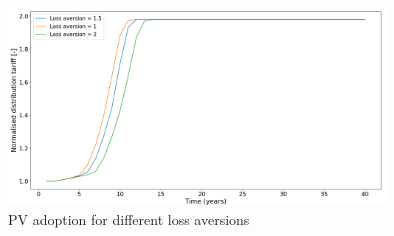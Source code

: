 \noindent
\newline
\begin{figure}[h!]
    \centering
    \includegraphics[width=10cm]{AppendixA/DistNBloss.PNG}
    \caption{PV adoption for different loss aversions}
    \label{fig:H}
\end{figure}
\newline \newline \newline \newline \newline
